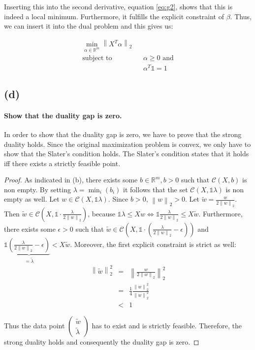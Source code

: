 \documentclass[a4paper, 11pt, titlepage]{article}
\newcommand{\norm}[1]{\left\lVert#1\right\rVert}
\begin{document}
Inserting this into the second derivative, equation \eqref{eq:g2}, shows that this is indeed a local minimum.
Furthermore, it fulfills the explicit constraint of $\beta$.
Thus, we can insert it into the dual problem and this gives us:

\begin{eqnarray*}
	\min_{\alpha \in \mathbb{R}^m} \norm{X^T\alpha}_2&&\\
	\text{subject to} && \alpha \ge 0 \text{ and}\\
	&& \alpha^T\mathds{1} = 1
\end{eqnarray*}

\subsection*{(d)}

\paragraph{Show that the duality gap is zero.}
	In order to show that the duality gap is zero, we have to prove that the strong duality holds.
	Since the original maximization problem is convex, we only have to show that the Slater's condition holds.
	The Slater's condition states that it holds iff there exists a strictly feasible point.
	
	\begin{proof}
		As indicated in (b), there exists some $b\in\mathbb{R}^m,b>0$ such that $\mathcal{C}(X,b)$ is non empty.
		By setting $\lambda = \min_i(b_i)$ it follows that the set $\mathcal{C}(X,\mathds{1}\lambda)$ is non empty as well.
		Let $w\in\mathcal{C}(X,\mathds{1}\lambda)$. 
		Since $b>0$, $\norm{w}_2>0$. Let $\tilde{w} = \frac{w}{2\norm{w}_2}$. 
		Then $\tilde{w} \in \mathcal{C}(X,\mathds{1}\cdot\frac{\lambda}{2\norm{w}_2})$, because $\mathds{1}\lambda \le X w \Leftrightarrow \mathds{1} \frac{\lambda}{2\norm{w}_2} \le X\tilde{w}$.
		Furthermore, there exists some $\epsilon>0$ such that $\tilde{w} \in \mathcal{C}\left(X,\mathds{1}\cdot \left(\frac{\lambda}{2\norm{w}_2}-\epsilon\right)\right)$ and $\mathds{1}\underbrace{\left(\frac{\lambda}{2\norm{w}_2}-\epsilon\right)}_{=\tilde{\lambda}} < X \tilde{w}$.
		Moreover, the first explicit constraint is strict as well:
		\begin{eqnarray*}
			\norm{\tilde{w}}_2^2 &=& \norm{\frac{w}{2\norm{w}_2}}_2^2\\
			&=& \frac{1}{4}\frac{\norm{w}_2^2}{\norm{w}_2^2}\\
			&<& 1
		\end{eqnarray*}
		
		Thus the data point $\begin{pmatrix} \tilde{w}\\ \tilde{\lambda} \end{pmatrix}$ has to exist and is strictly feasible.
		Therefore, the strong duality holds and consequently the duality gap is zero.
	\end{proof}
	
\end{document}
